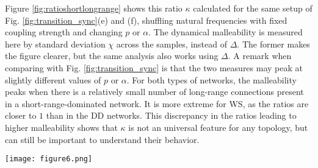 Figure \ref{fig:ratioshortlongrange} shows this ratio $\kappa$ calculated for the same setup of Fig. \ref{fig:transition_sync}(e) and (f), shuffling natural frequencies with fixed coupling strength and changing $p$ or $\alpha$. The dynamical malleability is measured here by standard deviation $\chi$ across the samples, instead of $\Delta$. The former makes the figure clearer, but the same analysis also works using $\Delta$. A remark when comparing with Fig. \ref{fig:transition_sync} is that the two measures may peak at slightly different values of $p$ or $\alpha$.  For both types of networks, the malleability peaks when there is a relatively small number of long-range connections present in a short-range-dominated network. It is more extreme for WS, as the ratios are closer to $1$ than in the DD networks. This discrepancy in the ratios leading to higher malleability shows that $\kappa$ is not an universal feature for any topology, but can still be important to understand their behavior.
%
\begin{figure*}[htb!]
    \centering
    \texttt{[image: figure6.png]}
    \caption{\textbf{Dynamical malleability peaks within a narrow interval in the relation of short-range to long-range connections}. Panel (a) illustrates the short-range (blue) and long-range (red) connections from the yellow unit for $d = 2$. Panel (b) shows the sample-to-sample fluctuations in the phase synchronization measured as the standard deviation $\chi$ of the distribution function of $\meanR$ against the ratio $\kappa$ of short-range to long-range connections calculated for several distinct topologies $p$ and $\alpha$. The green curve corresponds to the distance-dependent networks, with $\epsilon = 6.46154$ and 501 realizations per $\alpha$; purple corresponds to Watts-Strogatz networks, $\epsilon = 4.51282$ and 1501 realizations per $p$. The bottom axis show the values of $p$ and $\alpha$ for the respective ticks in $\kappa$ (note that values of $\alpha$ are not equally spaced). }
    \label{fig:ratioshortlongrange}
\end{figure*}

